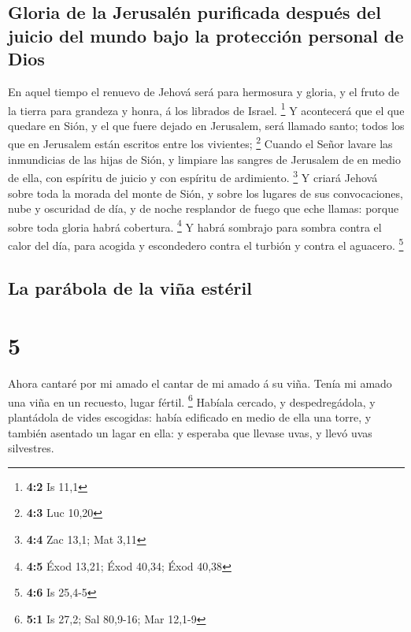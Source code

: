 \hypertarget{gloria-de-la-jerusaluxe9n-purificada-despuuxe9s-del-juicio-del-mundo-bajo-la-protecciuxf3n-personal-de-dios}{%
\subsection{Gloria de la Jerusalén purificada después del juicio del
mundo bajo la protección personal de
Dios}\label{gloria-de-la-jerusaluxe9n-purificada-despuuxe9s-del-juicio-del-mundo-bajo-la-protecciuxf3n-personal-de-dios}}

 En aquel tiempo el renuevo de Jehová será para hermosura y
gloria, y el fruto de la tierra para grandeza y honra, á los librados de
Israel. \footnote{\textbf{4:2} Is 11,1}  Y acontecerá que el
que quedare en Sión, y el que fuere dejado en Jerusalem, será llamado
santo; todos los que en Jerusalem están escritos entre los vivientes;
\footnote{\textbf{4:3} Luc 10,20}  Cuando el Señor lavare
las inmundicias de las hijas de Sión, y limpiare las sangres de
Jerusalem de en medio de ella, con espíritu de juicio y con espíritu de
ardimiento. \footnote{\textbf{4:4} Zac 13,1; Mat 3,11}  Y
criará Jehová sobre toda la morada del monte de Sión, y sobre los
lugares de sus convocaciones, nube y oscuridad de día, y de noche
resplandor de fuego que eche llamas: porque sobre toda gloria habrá
cobertura. \footnote{\textbf{4:5} Éxod 13,21; Éxod 40,34; Éxod 40,38}
 Y habrá sombrajo para sombra contra el calor del día, para
acogida y escondedero contra el turbión y contra el aguacero.
\footnote{\textbf{4:6} Is 25,4-5}

\hypertarget{la-paruxe1bola-de-la-viuxf1a-estuxe9ril}{%
\subsection{La parábola de la viña
estéril}\label{la-paruxe1bola-de-la-viuxf1a-estuxe9ril}}

\hypertarget{section-4}{%
\section{5}\label{section-4}}

 Ahora cantaré por mi amado el cantar de mi amado á su viña.
Tenía mi amado una viña en un recuesto, lugar fértil. \footnote{\textbf{5:1}
  Is 27,2; Sal 80,9-16; Mar 12,1-9}  Habíala cercado, y
despedregádola, y plantádola de vides escogidas: había edificado en
medio de ella una torre, y también asentado un lagar en ella: y esperaba
que llevase uvas, y llevó uvas silvestres.


